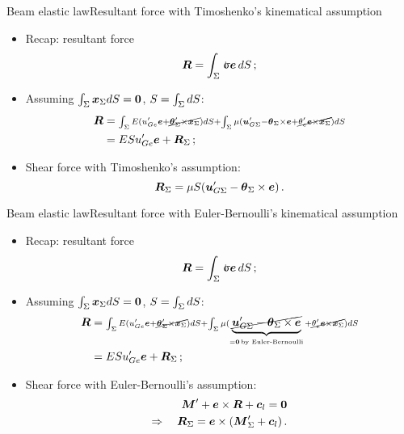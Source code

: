 \begin{frame}{Beam elastic law}{Resultant force with Timoshenko's kinematical assumption}

\begin{itemize}
\item Recap: resultant force
\begin{displaymath}
\Fres=\int_\Sigma\stress\ev\,\id S\,;
\end{displaymath}
\item Assuming $\int_\Sigma{\boldsymbol{x}}_\Sigma d S={\bf 0}$, $S=\int_\Sigma d S$:
\begin{displaymath}
\begin{split}
{\boldsymbol{R}} &= \;\scriptstyle \int_\Sigma E(u_{Ge}'{\boldsymbol{e}}+\cancel{{\boldsymbol{\theta}}_\Sigma'\times{\boldsymbol{x}}_\Sigma})d S+\int_\Sigma\mu({\boldsymbol{u}}_{G\Sigma}'-{\boldsymbol{\theta}}_\Sigma\times{\boldsymbol{e}}+\cancel{\theta_e'{\boldsymbol{e}}\times{\boldsymbol{x}}_\Sigma})d S \\
&=ESu_{Ge}'{\boldsymbol{e}}+{\boldsymbol{R}}_\Sigma\,;
\end{split}
\end{displaymath}
\item Shear force with Timoshenko's assumption:
\begin{displaymath}
{\boldsymbol{R}}_\Sigma=\mu S({\boldsymbol{u}}_{G\Sigma}'-{\boldsymbol{\theta}}_\Sigma\times{\boldsymbol{e}})\,.
\end{displaymath}
\end{itemize}

\end{frame}

\begin{frame}{Beam elastic law}{Resultant force with Euler-Bernoulli's kinematical assumption}

\begin{itemize}
\item Recap: resultant force
\begin{displaymath}
\Fres=\int_\Sigma\stress\ev\,\id S\,;
\end{displaymath}
\item Assuming $\int_\Sigma{\boldsymbol{x}}_\Sigma d S={\bf 0}$, $S=\int_\Sigma d S$:
\begin{displaymath}
\begin{split}
{\boldsymbol{R}} &= \;\scriptstyle \int_\Sigma E(u_{Ge}'{\boldsymbol{e}}+\cancel{{\boldsymbol{\theta}}_\Sigma'\times{\boldsymbol{x}}_\Sigma})d S+\int_\Sigma\mu(\underbrace{\cancel{{\boldsymbol{u}}_{G\Sigma}'-{\boldsymbol{\theta}}_\Sigma\times{\boldsymbol{e}}}}_{={\bf 0}\,\text{by Euler-Bernoulli}}+\cancel{\theta_e'{\boldsymbol{e}}\times{\boldsymbol{x}}_\Sigma})d S \\
&=ESu_{Ge}'{\boldsymbol{e}}+{\boldsymbol{R}}_\Sigma\,;
\end{split}
\end{displaymath}
\item Shear force with Euler-Bernoulli's assumption:
\begin{displaymath}
\begin{split}
{\boldsymbol{M}}'+{\boldsymbol{e}}\times{\boldsymbol{R}}+{\boldsymbol{c}}_l={\bf 0} \\
\Rightarrow\quad {\boldsymbol{R}}_\Sigma={\boldsymbol{e}}\times({\boldsymbol{M}}_\Sigma'+{\boldsymbol{c}}_l)\,.
\end{split}
\end{displaymath}
\end{itemize}

\end{frame}

